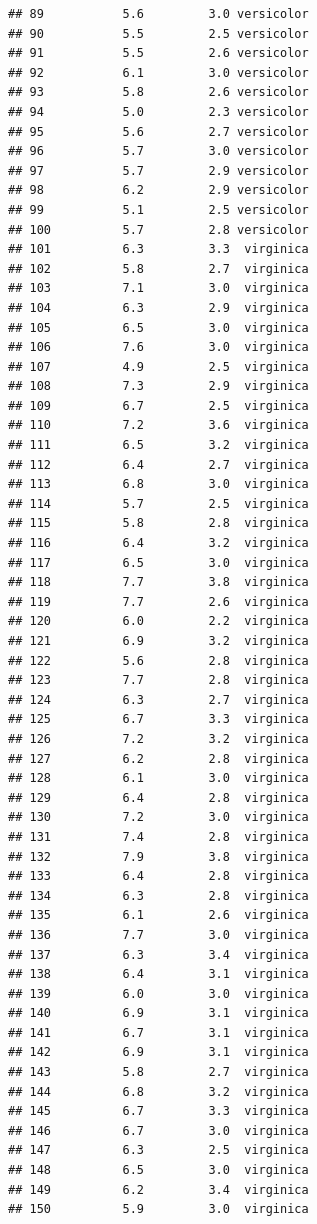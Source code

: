 \documentclass[11pt,]{book}
\begin{document}
\begin{verbatim}
## 89           5.6         3.0 versicolor
## 90           5.5         2.5 versicolor
## 91           5.5         2.6 versicolor
## 92           6.1         3.0 versicolor
## 93           5.8         2.6 versicolor
## 94           5.0         2.3 versicolor
## 95           5.6         2.7 versicolor
## 96           5.7         3.0 versicolor
## 97           5.7         2.9 versicolor
## 98           6.2         2.9 versicolor
## 99           5.1         2.5 versicolor
## 100          5.7         2.8 versicolor
## 101          6.3         3.3  virginica
## 102          5.8         2.7  virginica
## 103          7.1         3.0  virginica
## 104          6.3         2.9  virginica
## 105          6.5         3.0  virginica
## 106          7.6         3.0  virginica
## 107          4.9         2.5  virginica
## 108          7.3         2.9  virginica
## 109          6.7         2.5  virginica
## 110          7.2         3.6  virginica
## 111          6.5         3.2  virginica
## 112          6.4         2.7  virginica
## 113          6.8         3.0  virginica
## 114          5.7         2.5  virginica
## 115          5.8         2.8  virginica
## 116          6.4         3.2  virginica
## 117          6.5         3.0  virginica
## 118          7.7         3.8  virginica
## 119          7.7         2.6  virginica
## 120          6.0         2.2  virginica
## 121          6.9         3.2  virginica
## 122          5.6         2.8  virginica
## 123          7.7         2.8  virginica
## 124          6.3         2.7  virginica
## 125          6.7         3.3  virginica
## 126          7.2         3.2  virginica
## 127          6.2         2.8  virginica
## 128          6.1         3.0  virginica
## 129          6.4         2.8  virginica
## 130          7.2         3.0  virginica
## 131          7.4         2.8  virginica
## 132          7.9         3.8  virginica
## 133          6.4         2.8  virginica
## 134          6.3         2.8  virginica
## 135          6.1         2.6  virginica
## 136          7.7         3.0  virginica
## 137          6.3         3.4  virginica
## 138          6.4         3.1  virginica
## 139          6.0         3.0  virginica
## 140          6.9         3.1  virginica
## 141          6.7         3.1  virginica
## 142          6.9         3.1  virginica
## 143          5.8         2.7  virginica
## 144          6.8         3.2  virginica
## 145          6.7         3.3  virginica
## 146          6.7         3.0  virginica
## 147          6.3         2.5  virginica
## 148          6.5         3.0  virginica
## 149          6.2         3.4  virginica
## 150          5.9         3.0  virginica
\end{verbatim}
\end{document}

